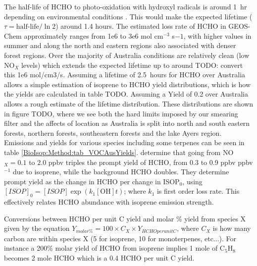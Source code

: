     The half-life of HCHO to photo-oxidation with hydroxyl radicals is around 1~hr depending on environmental conditions \parencite{WHO_hcho_guidelines_2010}.
    This would make the expected lifetime ($\tau = \text{half-life}/\ln{2}$) around 1.4 hours.
    The estimated loss rate of HCHO in GEOS-Chem approximately ranges from 1e6 to 3e6 mol cm$^{-3}$ s${-1}$, with higher values in summer and along the north and eastern regions also associated with denser forest regions.
    Over the majority of Australia conditions are relatively clean (low NO$_X$ levels) which extends the expected lifetime up to around TODO: convert this  1e6 mol/cm3/s.
    Assuming a lifetime of 2.5~hours for HCHO over Australia allows a simple estimation of isoprene to HCHO yield distributions, which is how the yields are calculated in table TODO.
    Assuming a Yield of 0.2 over Australia allows a rough estimate of the lifetime distribution.
    These distributions are shown in figure TODO, where we see both the hard limits imposed by our smearing filter and the affects of location as Australia is split into north and south eastern forests, northern forests, southeastern forests and the lake Ayers region.
    Emissions and yields for various species including some terpenes can be seen in table \ref{BioIsop:Method:tab_VOCAusYields}.
    \textcite{Wolfe2016} determine that going from NO$_X = 0.1$ to $2.0$ ppbv triples the prompt yield of HCHO, from 0.3 to 0.9 ppbv ppbv$^{-1}$ due to isoprene, while the background HCHO doubles.
    They determine prompt yield as the change in HCHO per change in ISOP$_0$, using $[ISOP]_0=[ISOP]\exp(k_1[\mathrm{OH}]t)$; where $k_1$ is first order loss rate.
    This effectively relates HCHO abundance with isoprene emission strength.
    
        
    Conversions between HCHO per unit C yield and molar \% yield from species X given by the equation $ Y_{molar \%} = 100 \times C_X \times Y_{HCHO per unit C} $, where $C_X$ is how many carbon are within species X (5 for isoprene, 10 for monoterpenes, etc...).
    For instance a 200\% molar yield of HCHO from isoprene implies 1 mole of C$_5$H$_8$ becomes 2 mole HCHO which is a 0.4 HCHO per unit C yield.
    
